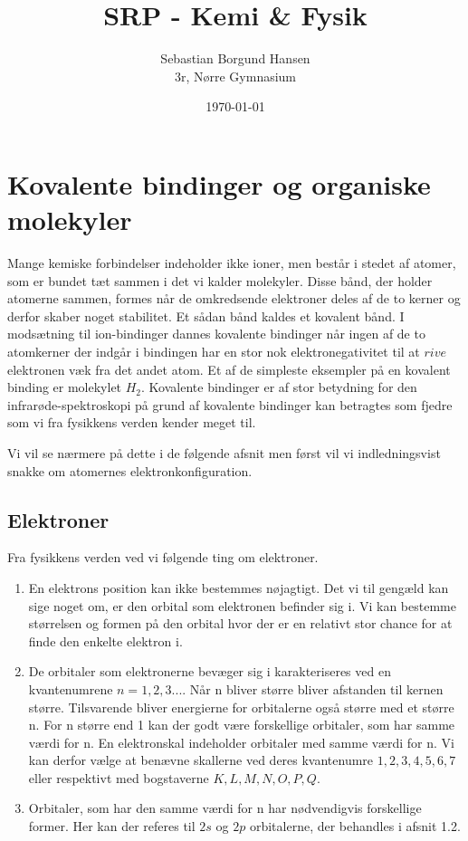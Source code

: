 \documentclass[12pt,a4paper]{article}
\author{Sebastian Borgund Hansen \\ 3r, Nørre Gymnasium}
\title{SRP - Kemi \& Fysik}
\date{\today}
\theoremstyle{break}
\theoremstyle{nonumberplain}
\begin{document}
\maketitle
\section{Kovalente bindinger og organiske molekyler}

Mange kemiske forbindelser indeholder ikke ioner, men består i stedet af atomer, som er bundet tæt sammen i det vi kalder molekyler. Disse bånd, der holder atomerne sammen, formes når de omkredsende elektroner deles af de to kerner og derfor skaber noget stabilitet. Et sådan bånd kaldes et kovalent bånd. I modsætning til ion-bindinger dannes kovalente bindinger når ingen af de to atomkerner der indgår i bindingen har en stor nok elektronegativitet til at $rive$ elektronen væk fra det andet atom. Et af de simpleste eksempler på en kovalent binding er molekylet $H_2$. Kovalente bindinger er af stor betydning for den infrarøde-spektroskopi på grund af kovalente bindinger kan betragtes som fjedre som vi fra fysikkens verden kender meget til.

Vi vil se nærmere på dette i de følgende afsnit men først vil vi indledningsvist snakke om atomernes elektronkonfiguration. 


\subsection{Elektroner}
Fra fysikkens verden ved vi følgende ting om elektroner. 

\begin{enumerate}
\item En elektrons position kan ikke bestemmes nøjagtigt. Det vi til gengæld kan sige noget om, er den orbital som elektronen befinder sig i. Vi kan bestemme størrelsen og formen på den orbital hvor der er en relativt stor chance for at finde den enkelte elektron i.

\item De orbitaler som elektronerne bevæger sig i karakteriseres ved en kvantenumrene $n = 1,2,3 ...$. Når n bliver større bliver afstanden til kernen større. Tilsvarende bliver energierne for orbitalerne også større med et større n. For n større end 1 kan der godt være forskellige orbitaler, som har samme værdi for n. En elektronskal indeholder orbitaler med samme værdi for n. Vi kan derfor vælge at benævne skallerne ved deres kvantenumre $1,2,3,4,5,6,7$ eller respektivt med bogstaverne $K,L,M,N,O,P,Q$. 

\item Orbitaler, som har den samme værdi for n har nødvendigvis forskellige former. Her kan der referes til $2s$ og $2p$ orbitalerne, der behandles i afsnit 1.2.
\end{enumerate}
\end{document}
